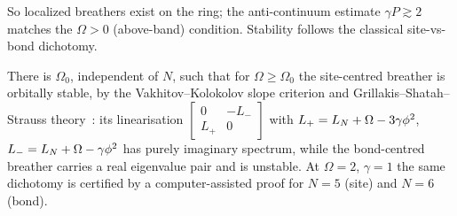 \noindent So localized breathers exist on the ring; the anti-continuum estimate $\gamma P\gtrsim2$ matches the
$\Omega>0$ (above-band) condition. Stability follows the classical site-vs-bond dichotomy.

\begin{proposition}\label{prop:breather-stab}
There is $\Omega_0$, independent of $N$, such that for $\Omega\ge\Omega_0$ the site-centred breather is
orbitally stable, by the Vakhitov--Kolokolov slope criterion and Grillakis--Shatah--Strauss
theory~\cite{VK,GSS,GSS2}: its linearisation $\left[\begin{smallmatrix}0&-L_-\\L_+&0\end{smallmatrix}\right]$
with $L_+=L_N+\Omega-3\gamma\phi^2$, $L_-=L_N+\Omega-\gamma\phi^2$ has purely imaginary spectrum, while the
bond-centred breather carries a real eigenvalue pair and is unstable. At $\Omega=2$, $\gamma=1$ the same
dichotomy is certified by a computer-assisted proof for $N=5$ (site) and $N=6$ (bond).
\end{proposition}


